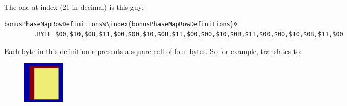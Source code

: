 The one at index  (21 in decimal) is this guy:

\begin{lstlisting}[basicstyle=\tiny\ttfamily,escapechar=\%]
bonusPhaseMapRowDefinitions%\index{bonusPhaseMapRowDefinitions}%   
        .BYTE $00,$10,$0B,$11,$00,$00,$10,$0B,$11,$00,$00,$10,$0B,$11,$00,$00,$10,$0B,$11,$00
\end{lstlisting}

Each byte in this definition represents a square cell of four bytes. So for example, 
translates to:

\begin{figure}[H]
  {
    \begin{adjustbox}{width=2cm,center}
        \includegraphics[width=2cm]{src/bonusphase/row21_cell0.png}%
    \end{adjustbox}
  }
\end{figure}

